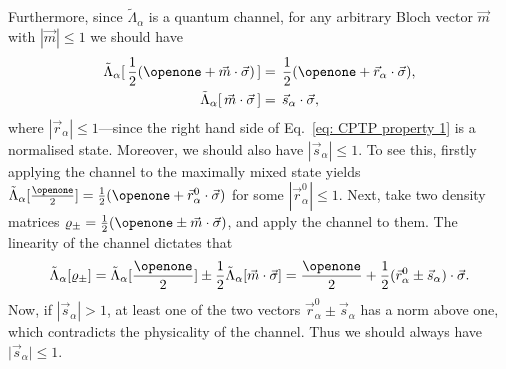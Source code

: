 \documentclass[aps,superscriptaddress,twocolumn,twoside,floatfix,pra,nofootinbib,a4paper]{revtex4-2}
\begin{document}
Furthermore, since $\tilde{\Lambda}_{\alpha}$ is a quantum channel, for any arbitrary Bloch vector $\vec m$ with $|\vec m|\leq 1$ we should have  
\begin{align}
    \tilde{\Lambda}_\alpha [\,\frac{1}{2}(\openone +\vec{m} \cdot \vec{\sigma} )\,]& = \,  \frac{1}{2}(\openone + \vec{r}_{\alpha} \cdot \vec{\sigma} ) \label{eq: CPTP property 1}, \\
    \tilde{\Lambda}_\alpha [\,\vec{m}\cdot \vec{\sigma}\, ]&= \,\vec{s}_\alpha\cdot\vec{\sigma} ,
    \label{eq: CPTP property 2} 
\end{align}
where $|\vec r_{\alpha}|\leq 1$---since the right hand side of Eq.~\eqref{eq: CPTP property 1} is a normalised state. Moreover, we should also have $|\vec s_{\alpha}|\leq 1$. To see this, firstly applying the channel to the maximally mixed state yields $\tilde \Lambda_{\alpha} [\frac{\openone}{2}] = \frac{1}{2} (\openone + \vec r^0_{\alpha} \cdot \vec\sigma)$ for some $|\vec r^0_{\alpha}|\leq 1$. 
Next, take two density matrices $\varrho_{\pm}= \frac{1}{2}(\openone \pm\vec{m} \cdot \vec{\sigma} )$, and apply the channel to them. The linearity of the channel dictates that
\begin{align*}
    \tilde \Lambda_{\alpha}[\varrho_{\pm}] = \tilde \Lambda_{\alpha}[\frac{\openone}{2}] \pm \frac{1}{2}\tilde \Lambda_{\alpha}[ \vec{m} \cdot \vec{\sigma}] = \frac{\openone}{2} + \frac{1}{2}(\vec r_{\alpha}^0 \pm \vec s_{\alpha})\cdot\vec\sigma.
\end{align*} 
Now, if $ |\vec s_{\alpha}| > 1$, at least one of the two vectors $\vec r_{\alpha}^0 \pm \vec s_{\alpha}$ has a norm above one, which contradicts the physicality of the channel. Thus we should always have $\vert \vec s_{\alpha} \vert \leq 1$. 
\end{document}
